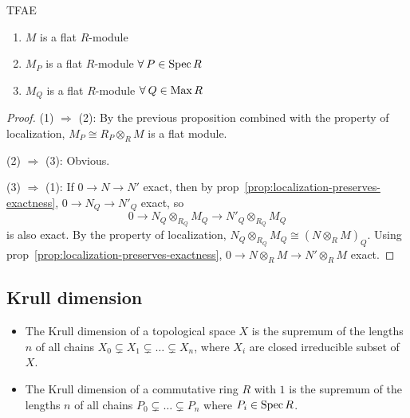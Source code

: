 \begin{prop}
  TFAE
  \begin{enumerate}[(1)]
    \item $M$ is a flat $R$-module
    \item $M_P$ is a flat $R$-module $\forall P \in \Spec R$
    \item $M_Q$ is a flat $R$-module $\forall Q \in \Max R$
  \end{enumerate}

  \begin{proof}
    (1) $\Rightarrow$ (2): By the previous proposition combined with the property
    of localization, $M_P \cong R_P \otimes_R M$ is a flat module.

    (2) $\Rightarrow$ (3): Obvious.

    (3) $\Rightarrow$ (1):
    If $0 \to N \to N'$ exact, then by prop~\ref{prop:localization-preserves-exactness},
    $0 \to N_Q \to N'_Q$ exact, so
    \[ 0 \to N_Q \otimes_{R_Q} M_Q \to N'_Q \otimes_{R_Q} M_Q \]
    is also exact. By the property of localization, $N_Q \otimes_{R_Q} M_Q \cong (N \otimes_R M)_Q$.
    Using prop~\ref{prop:localization-preserves-exactness}, $0 \to N \otimes_R M \to N' \otimes_R M$ exact.
  \end{proof}
\end{prop}

\subsection{Krull dimension}
\begin{definition} \hfill
  \begin{itemize}
    \item 
      The Krull dimension of a topological space $X$ is the supremum of the lengths $n$ of
      all chains $X_0 \subsetneq X_1 \subsetneq \dots \subsetneq X_n$, where $X_i$ are closed irreducible subset of $X$.
    \item
      The Krull dimension of a commutative ring $R$ with $1$ is the
      supremum of the lengths $n$ of all chains $P_0 \subsetneq \dots \subsetneq P_n$ where $P_i \in \operatorname{Spec} R$.
  \end{itemize}
\end{definition}

